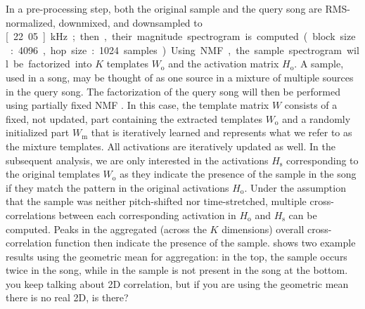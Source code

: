 \documentclass{article}
\begin{document}
In a pre-processing step, both the original sample and the query song are RMS-normalized, downmixed, and downsampled to \unit[22.05]{kHz}; then, their magnitude spectrogram is computed (block size: 4096, hop size: 1024 samples). %
Using NMF, the sample spectrogram will be factorized into $K$ templates $W_\mathrm{o}$ and the activation matrix $H_\mathrm{o}$. A sample, used in a song, may be thought of as one source in a mixture of multiple sources in the query song. 
The factorization of the query song will then be performed using partially fixed NMF \cite{wu_drum_2015,wu2015drum}. In this case, the template matrix $W$ consists of a fixed, not updated, part containing the extracted templates $W_\mathrm{o}$ and a randomly initialized part $W_\mathrm{m}$ that is iteratively learned and represents what we refer to as the mixture templates. All activations are iteratively updated as well.
In the subsequent analysis, we are only interested in the activations $H_\mathrm{s}$ corresponding to the original templates $W_\mathrm{o}$ as they indicate the presence of the sample in the song if they match the pattern in the original activations $H_\mathrm{o}$. Under the assumption that the sample was neither pitch-shifted nor time-stretched, multiple cross-correlations between each corresponding activation in $H_\mathrm{o}$ and $H_\mathrm{s}$ can be computed. Peaks in the aggregated (across the $K$ dimensions) overall cross-correlation function then indicate the presence of the sample.  shows two example results using the geometric mean for aggregation: in the top, the sample occurs twice in the song, while in the sample is not present in the song at the bottom. {\color{red}you keep talking about 2D correlation, but if you are using the geometric mean there is no real 2D, is there?}
\end{document}
